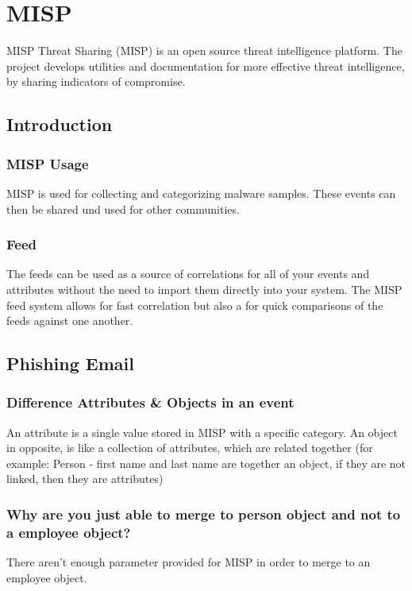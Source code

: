

\section{MISP}
MISP Threat Sharing (MISP) is an open source threat intelligence platform. The project develops utilities and documentation for more effective threat intelligence, by sharing indicators of compromise.

\subsection{Introduction}

\subsubsection{MISP Usage}
MISP is used for collecting and categorizing malware samples. These events can then be shared und used for other communities.

\subsubsection{Feed}
The feeds can be used as a source of correlations for all of your events and attributes without the need to import them directly into your system. The MISP feed system allows for fast correlation but also a for quick comparisons of the feeds against one another.

\subsection{Phishing Email}

\subsubsection{Difference Attributes \& Objects in an event}
An attribute is a single value stored in MISP with a specific category. An object in opposite, is like a collection of attributes, which are related together (for example: Person - first name and last name are together an object, if they are not linked, then they are attributes)

\subsubsection{Why are you just able to merge to person object and not to a employee object?}
There aren't enough parameter provided for MISP in order to merge to an employee object.

